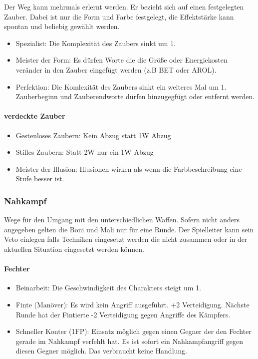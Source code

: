 \documentclass{article}
\begin{document}
Der Weg kann mehrmals erlernt werden. Er bezieht sich auf einen festgelegten Zauber. Dabei ist nur die Form und
Farbe festgelegt, die Effektstärke kann spontan und beliebig gewählt werden.

\begin{itemize}
\item Spezialist: Die Komplexität des Zaubers sinkt um 1.
\item Meister der Form: Es dürfen Worte die die Größe oder Energiekosten veränder in den Zauber eingefügt werden (z.B BET oder AROL).
\item Perfektion: Die Komlexität des Zaubers sinkt ein weiteres Mal um 1. Zauberbeginn und Zauberendworte dürfen hinzugegfügt oder entfernt werden.
\end{itemize}

\paragraph{verdeckte Zauber}

\begin{itemize}
\item Gestenloses Zaubern: Kein Abzug statt 1W Abzug
\item Stilles Zaubern: Statt 2W nur ein 1W Abzug
\item Meister der Illusion: Illusionen wirken als wenn die Farbbeschreibung eine Stufe besser ist.
\end{itemize}

\subsubsection{Nahkampf}

Wege für den Umgang mit den unterschiedlichen Waffen. Sofern nicht anders angegeben gelten die Boni und Mali nur für
eine Runde. Der Spielleiter kann sein Veto einlegen falls Techniken eingesetzt werden die nicht zusammen oder in der
aktuellen Situation eingesetzt werden können.

\paragraph{Fechter}

\begin{itemize}
\item Beinarbeit: Die Geschwindigkeit des Charakters steigt um 1.
\item Finte (Manöver): Es wird kein Angriff ausgeführt. +2 Verteidigung. Nächste Runde hat der Fintierte -2 Verteidigung gegen Angriffe des Kämpfers.
\item Schneller Konter (1FP): Einsatz möglich gegen einen Gegner der den Fechter gerade im Nahkampf verfehlt hat. Es ist sofort ein Nahkampfangriff gegen diesen Gegner möglich. Das verbraucht keine Handlung.
\end{itemize}
\end{document}
